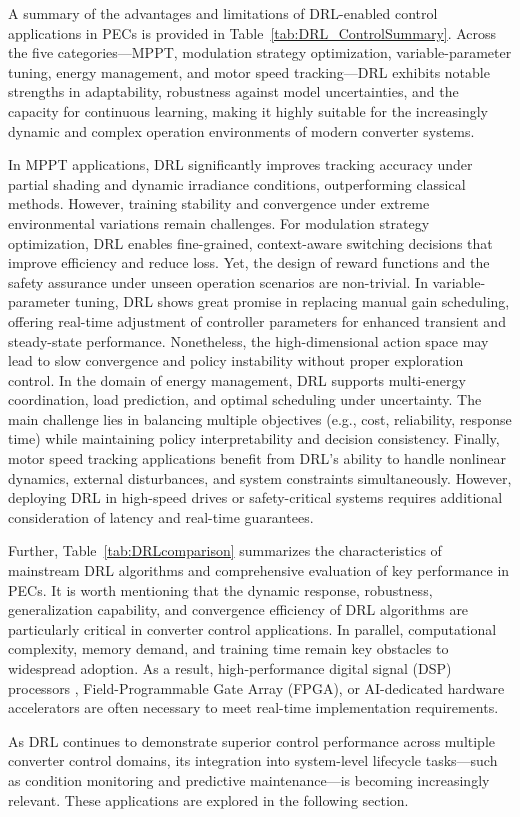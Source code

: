 A summary of the advantages and limitations of DRL-enabled control applications in PECs is provided in Table~\ref{tab:DRL_ControlSummary}. Across the five categories—MPPT, modulation strategy optimization, variable-parameter tuning, energy management, and motor speed tracking—DRL exhibits notable strengths in adaptability, robustness against model uncertainties, and the capacity for continuous learning, making it highly suitable for the increasingly dynamic and complex operation environments of modern converter systems.

In MPPT applications, DRL significantly improves tracking accuracy under partial shading and dynamic irradiance conditions, outperforming classical methods. However, training stability and convergence under extreme environmental variations remain challenges. For modulation strategy optimization, DRL enables fine-grained, context-aware switching decisions that improve efficiency and reduce loss. Yet, the design of reward functions and the safety assurance under unseen operation scenarios are non-trivial. In variable-parameter tuning, DRL shows great promise in replacing manual gain scheduling, offering real-time adjustment of controller parameters for enhanced transient and steady-state performance. Nonetheless, the high-dimensional action space may lead to slow convergence and policy instability without proper exploration control. In the domain of energy management, DRL supports multi-energy coordination, load prediction, and optimal scheduling under uncertainty. The main challenge lies in balancing multiple objectives (e.g., cost, reliability, response time) while maintaining policy interpretability and decision consistency. Finally, motor speed tracking applications benefit from DRL's ability to handle nonlinear dynamics, external disturbances, and system constraints simultaneously. However, deploying DRL in high-speed drives or safety-critical systems requires additional consideration of latency and real-time guarantees.

Further, Table~\ref{tab:DRLcomparison} summarizes the characteristics of mainstream DRL algorithms and comprehensive evaluation of key performance in PECs. It is worth mentioning that the dynamic response, robustness, generalization capability, and convergence efficiency of DRL algorithms are particularly critical in converter control applications. In parallel, computational complexity, memory demand, and training time remain key obstacles to widespread adoption. As a result, high-performance digital signal (DSP) processors , Field-Programmable Gate Array (FPGA), or AI-dedicated hardware accelerators are often necessary to meet real-time implementation requirements.

As DRL continues to demonstrate superior control performance across multiple converter control domains, its integration into system-level lifecycle tasks—such as condition monitoring and predictive maintenance—is becoming increasingly relevant. These applications are explored in the following section.

